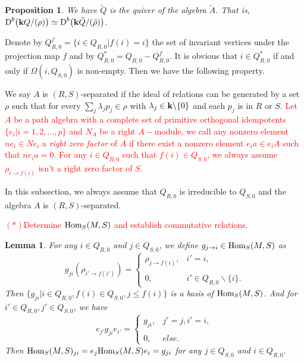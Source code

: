 \documentclass[a4paper, reqno]{amsart}
\newtheorem{lem}[thm]{Lemma}
\newtheorem{prop}[thm]{Proposition}
\theoremstyle{definition}
\theoremstyle{remark}
\numberwithin{equation}{section}
\begin{document}
\begin{prop} \label{prop 2.10}
We have $\tilde{Q}$ is the quiver of the algebra $\tilde{A}$. That is, $\textup{D}^b\big({\bf k} Q/(\rho)\big)\simeq \textup{D}^b\big({\bf k} \tilde{Q}/(\tilde{\rho})\big)$.    
\end{prop}

\newpage
Denote by $Q_{R,0}^{f}=\{i\in Q_{R,0}|f(i)=i\}$ the set of invariant vertices under the projection map $f$ and by $Q_{R,0}^{*}=Q_{R,0}-Q_{R,0}^{f}$. It is obvious that $i\in Q_{R,0}^{*}$ if and only if $\Omega(i,Q_{S,0})$ is non-empty. Then we have the following property.

We say $A$ is $(R,S)$-separated if the ideal of relations can be generated by a set $\rho$ such that for every $\sum_j\lambda_j p_j\in\rho$ with $\lambda_j\in{\bf k}\backslash\{0\}$ and each $p_j$ is in $R$ or $S$. 
\textcolor{red}{ Let $A$ be a path algebra with a complete set of primitive orthogonal idempotents $\{e_i|i= 1,2,...,p\}$ and $N_A$ be a right $A-$module, we call any nonzero element $ n{e_{i}} \in N{e_{i}}$ a \emph{right zero factor} of $A$ if there exist a nonzero element ${e_i}a \in e_{i}A$ such that $n{e_i}a = 0$. For any $i\in Q_{R,0}$ such that $f(i)\in Q_{S,0}$, we always assume $\rho_{i\to f(i)}$ isn't a right zero factor of $S$. }

In this subsection, we always assume that $Q_{R,0}$ is irreducible to $Q_{S,0}$ and the algebra $A$ is $(R,S)$-separated. 

\textcolor{red}{ $(*)$Determine $\textup{Hom}_S(M,S)$ and establish commutative relations.}

\begin{lem} 
For any $i\in Q_{R,0}$ and $j\in Q_{S,0}$, we define $g_{j\to i}\in \textup{Hom}_S(M,S)$ as 
$$g_{j i}(\rho_{i'\to f(i')}) =\left\{\begin{array}{ll}
  \rho_{j\to f(i)} ,& i'=i,\\\\
0 ,& i'\in Q_{R,0}\backslash\{i\}.\end{array}\right.$$ 
Then $\{g_{ji}| i\in Q_{R,0},f(i)\in Q_{S,0}, j\leq f(i) \}$ is a basis of $\textup{Hom}_S(M,S)$. And for $i'\in Q_{R,0},j'\in Q_{S,0}$, we have
$$e_{j'} g_{ji} e_{i'} =\left\{\begin{array}{ll}
 g_{ji} ,& j'=j, i'=i,\\\\
0 ,& else.\end{array}\right.$$ 
Then $\textup{Hom}_S(M,S)_{ji} = e_j \textup{Hom}_S(M,S) e_i=  g_{ji}$ for any $j\in Q_{S,0} $ and $i\in Q_{R,0}$. 
\end{lem}
\end{document}
